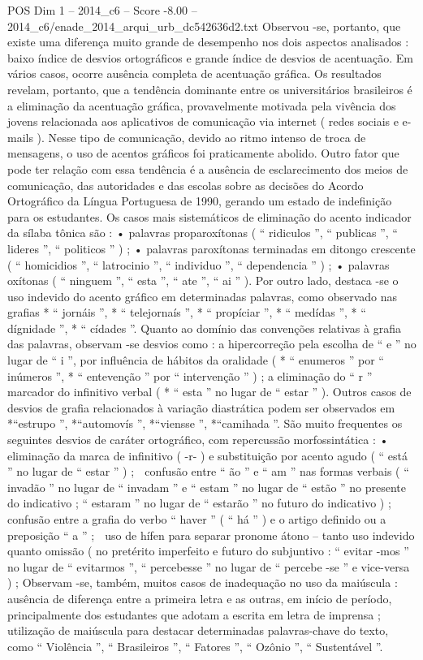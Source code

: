 \begin{textsample}{POS Dim 1 – 2014\_c6 – Score -8.00 – 2014\_c6/enade\_2014\_arqui\_urb\_dc542636d2.txt}
Observou -se, portanto, que existe uma diferença muito grande de desempenho nos dois aspectos analisados : baixo índice de desvios ortográficos e grande índice de desvios de acentuação.
Em vários casos, ocorre ausência completa de acentuação gráfica.
Os resultados revelam, portanto, que a tendência dominante entre os universitários brasileiros é a eliminação da acentuação gráfica, provavelmente motivada pela vivência dos jovens relacionada aos aplicativos de comunicação via internet ( redes sociais e e-mails ).
Nesse tipo de comunicação, devido ao ritmo intenso de troca de mensagens, o uso de acentos gráficos foi praticamente abolido.
Outro fator que pode ter relação com essa tendência é a ausência de esclarecimento dos meios de comunicação, das autoridades e das escolas sobre as decisões do Acordo Ortográfico da Língua Portuguesa de 1990, gerando um estado de indefinição para os estudantes.
Os casos mais sistemáticos de eliminação do acento indicador da sílaba tônica são : • palavras proparoxítonas ( “ ridiculos ”, “ publicas ”, “ lideres ”, “ politicos ” ) ; • palavras paroxítonas terminadas em ditongo crescente ( “ homicidios ”, “ latrocinio ”, “ individuo ”, “ dependencia ” ) ; • palavras oxítonas ( “ ninguem ”, “ esta ”, “ ate ”, “ ai ” ).
Por outro lado, destaca -se o uso indevido do acento gráfico em determinadas palavras, como observado nas grafias * “ jornáis ”, * “ telejornaís ”, * “ propíciar ”, * “ medídas ”, * “ dígnidade ”, * “ cídades ”.
Quanto ao domínio das convenções relativas à grafia das palavras, observam -se desvios como : a hipercorreção pela escolha de “ e ” no lugar de “ i ”, por influência de hábitos da oralidade ( * “ enumeros ” por “ inúmeros ”, * “ entevenção ” por “ intervenção ” ) ; a eliminação do “ r ” marcador do infinitivo verbal ( * “ esta ” no lugar de “ estar ” ).
Outros casos de desvios de grafia relacionados à variação diastrática podem ser observados em *“estrupo ”, *“automovís ”, *“viensse ”, *“camihada ”.
São muito frequentes os seguintes desvios de caráter ortográfico, com repercussão morfossintática : • eliminação da marca de infinitivo ( -r- ) e substituição por acento agudo ( “ está ” no lugar de “ estar ” ) ;  confusão entre “ ão ” e “ am ” nas formas verbais ( “ invadão ” no lugar de “ invadam ” e “ estam ” no lugar de “ estão ” no presente do indicativo ; “ estaram ” no lugar de “ estarão ” no futuro do indicativo ) ;  confusão entre a grafia do verbo “ haver ” ( “ há ” ) e o artigo definido ou a preposição “ a ” ;  uso de hífen para separar pronome átono – tanto uso indevido quanto omissão ( no pretérito imperfeito e futuro do subjuntivo : “ evitar -mos ” no lugar de “ evitarmos ”, “ percebesse ” no lugar de “ percebe -se ” e vice-versa ) ; Observam -se, também, muitos casos de inadequação no uso da maiúscula : ausência de diferença entre a primeira letra e as outras, em início de período, principalmente dos estudantes que adotam a escrita em letra de imprensa ; utilização de maiúscula para destacar determinadas palavras-chave do texto, como “ Violência ”, “ Brasileiros ”, “ Fatores ”, “ Ozônio ”, “ Sustentável ”.

\end{textsample}
